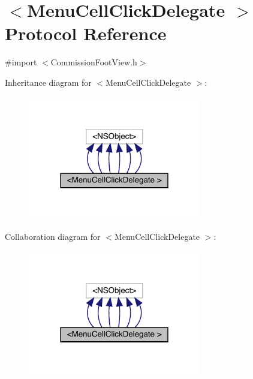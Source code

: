 \hypertarget{protocol_menu_cell_click_delegate_01-p}{}\section{$<$Menu\+Cell\+Click\+Delegate $>$ Protocol Reference}
\label{protocol_menu_cell_click_delegate_01-p}


{\ttfamily \#import $<$Commission\+Foot\+View.\+h$>$}



Inheritance diagram for $<$Menu\+Cell\+Click\+Delegate $>$\+:\nopagebreak
\begin{figure}[H]
\begin{center}
\leavevmode
\includegraphics[width=214pt]{protocol_menu_cell_click_delegate_01-p__inherit__graph}
\end{center}
\end{figure}


Collaboration diagram for $<$Menu\+Cell\+Click\+Delegate $>$\+:\nopagebreak
\begin{figure}[H]
\begin{center}
\leavevmode
\includegraphics[width=214pt]{protocol_menu_cell_click_delegate_01-p__coll__graph}
\end{center}
\end{figure}

